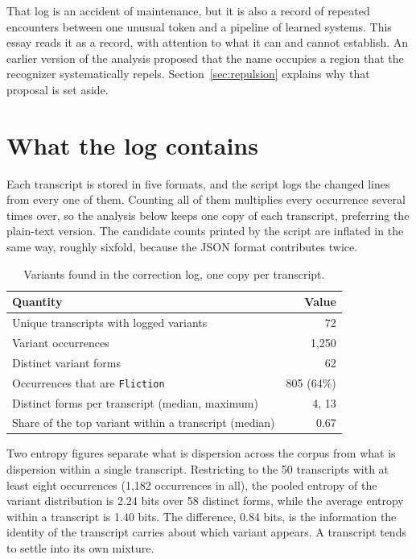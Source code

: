 \documentclass[11pt]{article}
\begin{document}
That log is an accident of maintenance, but it is also a record of repeated encounters between one unusual token and a pipeline of learned systems. This essay reads it as a record, with attention to what it can and cannot establish. An earlier version of the analysis proposed that the name occupies a region that the recognizer systematically repels. Section~\ref{sec:repulsion} explains why that proposal is set aside.

\section{What the log contains}

Each transcript is stored in five formats, and the script logs the changed lines from every one of them. Counting all of them multiplies every occurrence several times over, so the analysis below keeps one copy of each transcript, preferring the plain-text version. The candidate counts printed by the script are inflated in the same way, roughly sixfold, because the JSON format contributes twice.

\begin{table}[h]
\centering
\begin{tabular}{lr}
\toprule
Quantity & Value \\
\midrule
Unique transcripts with logged variants & 72 \\
Variant occurrences & 1,250 \\
Distinct variant forms & 62 \\
Occurrences that are \texttt{Fliction} & 805 (64\%) \\
Distinct forms per transcript (median, maximum) & 4, 13 \\
Share of the top variant within a transcript (median) & 0.67 \\
\bottomrule
\end{tabular}
\caption{Variants found in the correction log, one copy per transcript.}
\end{table}

Two entropy figures separate what is dispersion across the corpus from what is dispersion within a single transcript. Restricting to the 50 transcripts with at least eight occurrences (1,182 occurrences in all), the pooled entropy of the variant distribution is 2.24 bits over 58 distinct forms, while the average entropy within a transcript is 1.40 bits. The difference, 0.84 bits, is the information the identity of the transcript carries about which variant appears. A transcript tends to settle into its own mixture.
\end{document}
